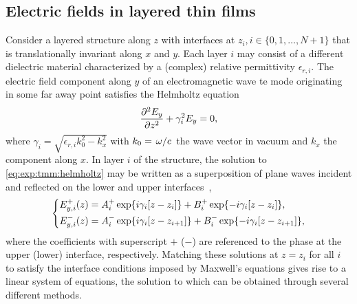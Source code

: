 \subsection{Electric fields in layered thin films}\label{subsec:exp:tmm:theory}
Consider a layered structure along $z$ with interfaces at $z_i, i\in\lbrace 0, 1, \dotsc, N+1\rbrace$ that is translationally invariant along $x$ and $y$.
Each layer $i$ may consist of a different dielectric material characterized by a (complex) relative permittivity $\epsilon_{r,i}$.
The electric field component along $y$ of an electromagnetic wave \gls{te} mode originating in some far away point satisfies the Helmholtz equation
\begin{equation}\label{eq:exp:tmm:helmholtz}
    \pdv[2]{E_y}{z} + \gamma_i^2 E_y = 0,
\end{equation}
where $\gamma_i = \sqrt{\epsilon_{r,i}k_0^2 - k_x^2}$ with $k_0=\flatfrac{\omega}{c}$ the wave vector in vacuum and $k_x$ the component along $x$.
In layer $i$ of the structure, the solution to \cref{eq:exp:tmm:helmholtz} may be written as a superposition of plane waves incident and reflected on the lower and upper interfaces~\cite{Langevin2024},
\begin{equation}\label{eq:exp:tmm:fields}
    \begin{dcases}
        E_{y,i}^{+}(z) = A_i^{+}\exp{\ensuremath{i}\gamma_i[z-z_{i}]} + B_i^{+}\exp{-\ensuremath{i}\gamma_i[z-z_{i}]}, \\
        E_{y,i}^{-}(z) = A_i^{-}\exp{\ensuremath{i}\gamma_i[z-z_{i+1}]} + B_i^{-}\exp{-\ensuremath{i}\gamma_i[z-z_{i+1}]},
    \end{dcases}
\end{equation}
where the coefficients with superscript $+$ ($-$) are referenced to the phase at the upper (lower) interface, respectively.
Matching these solutions at $z=z_i$ for all $i$ to satisfy the interface conditions imposed by Maxwell's equations gives rise to a linear system of equations, the solution to which can be obtained through several different methods.

